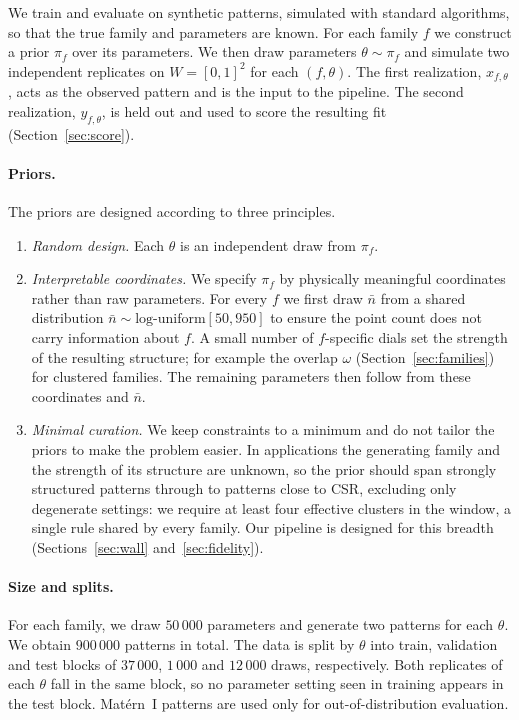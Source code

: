 \documentclass[twoside]{article}
\newcommand{\nb}{\bar n}
\begin{document}
We train and evaluate on synthetic patterns, simulated with standard algorithms, so that the true family and parameters are known. For each family $f$ we construct a prior $\pi_f$ over its parameters. We then draw parameters $\theta\sim\pi_f$ and simulate two independent replicates on $W = [0, 1]^2$ for each $(f, \theta)$. The first realization, $x_{f, \theta}$, acts as the observed pattern and is the input to the pipeline. The second realization, $y_{f, \theta}$, is held out and used to score the resulting fit (Section~\ref{sec:score}).

\paragraph{Priors.} The priors are designed according to three principles. 
\begin{enumerate}
    \item \emph{Random design.} Each $\theta$ is an independent draw from $\pi_f$.
    \item \emph{Interpretable coordinates.} We specify $\pi_f$ by physically meaningful coordinates rather than raw parameters. For every $f$ we first draw $\nb$ from a shared distribution $\nb\sim\text{log-uniform}[50,950]$ to ensure the point count does not carry information about $f$. A small number of $f$-specific dials set the strength of the resulting structure; for example the overlap $\omega$ (Section~\ref{sec:families}) for clustered families. The remaining parameters then follow from these coordinates and $\nb$.
    \item \emph{Minimal curation.} We keep constraints to a minimum and do not tailor the priors to make the problem easier. In applications the generating family and the strength of its structure are unknown, so the prior should span strongly structured patterns through to patterns close to CSR, excluding only degenerate settings: we require at least four effective clusters in the window, a single rule shared by every family. Our pipeline is designed for this breadth (Sections~\ref{sec:wall} and~\ref{sec:fidelity}).
\end{enumerate}

\paragraph{Size and splits.}
For each family, we draw $50\,000$ parameters and generate two patterns for each $\theta$. We obtain $900\,000$ patterns in total. The data is split by $\theta$ into train, validation and test blocks of $37\,000$, $1\,000$ and $12\,000$ draws, respectively. Both replicates of each $\theta$ fall in the same block, so no parameter setting seen in training appears in the test block. Mat\'ern~I patterns are used only for out-of-distribution evaluation.
\end{document}
